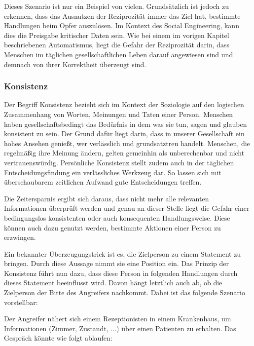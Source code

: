 Dieses Szenario ist nur ein Beispiel von vielen. Grundsätzlich ist jedoch zu erkennen, dass das Ausnutzen der Reziprozität immer das Ziel hat, bestimmte Handlungen beim Opfer auszulösen. Im Kontext des Social Engineering, kann dies die Preisgabe kritischer Daten sein. Wie bei einem im vorigen Kapitel beschriebenen Automatismus, liegt die Gefahr der Reziprozität darin, dass Menschen im täglichen gesellschaftlichen Leben darauf angewiesen sind und demnach von ihrer Korrektheit überzeugt sind.


\subsubsection{Konsistenz}
Der Begriff Konsistenz bezieht sich im Kontext der Soziologie auf den logischen Zusammenhang von Worten, Meinungen und Taten einer Person. Menschen haben gesellschaftsbedingt das Bedürfnis in dem was sie tun, sagen und glauben konsistent zu sein. Der Grund dafür liegt darin, dass in unserer Gesellschaft ein hohes Ansehen genießt, wer verlässlich und grundsatztreu handelt. Menschen, die regelmäßig ihre Meinung ändern, gelten gemeinhin als unberechenbar und nicht vertrauenswürdig.
Persönliche Konsistenz stellt zudem auch in der täglichen Entscheidungsfindung ein verlässliches Werkzeug dar. So lassen sich mit überschaubarem zeitlichen Aufwand gute Entscheidungen treffen.

Die Zeitersparnis ergibt sich daraus, dass nicht mehr alle relevanten Informationen überprüft werden und genau an dieser Stelle liegt die Gefahr einer bedingungslos konsistenten oder auch konsequenten Handlungsweise. Diese können auch dazu genutzt werden, bestimmte Aktionen einer Person zu erzwingen. \citep{cialdini}

Ein bekannter Überzeugungstrick ist es, die Zielperson zu einem Statement zu bringen. Durch diese Aussage nimmt sie eine Position ein. Das Prinzip der Konsistenz führt nun dazu, dass diese Person in folgenden Handlungen durch dieses Statement beeinflusst wird. Davon hängt letztlich auch ab, ob die Zielperson der Bitte des Angreifers nachkommt. Dabei ist das folgende Szenario vorstellbar:

Der Angreifer nähert sich einem Rezeptionisten in einem Krankenhaus, um Informationen (Zimmer, Zustandt, ...) über einen Patienten zu erhalten.
Das Gespräch könnte wie folgt ablaufen:

 

